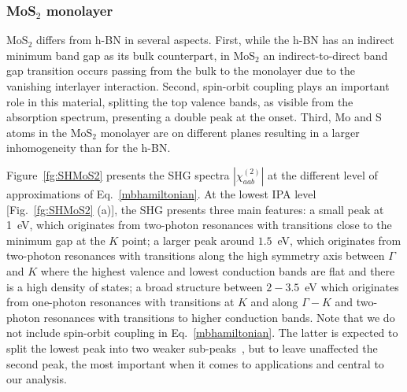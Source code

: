 \subsubsection{MoS$_2$ monolayer}
MoS$_2$ differs from h-BN in several aspects. First, while the h-BN has an indirect minimum band gap as its bulk counterpart, in MoS$_2$ an indirect-to-direct band gap transition occurs passing from the bulk to the monolayer due to the vanishing interlayer interaction.  Second, spin-orbit coupling plays an important role in this material, splitting the top valence bands, as visible from the absorption spectrum, presenting a double peak at the onset.\cite{PhysRevLett.105.136805} Third, Mo and S atoms in the MoS$_2$ monolayer are on different planes resulting in a larger inhomogeneity than for the h-BN.

Figure~\ref{fg:SHMoS2} presents the SHG spectra $|\chi^{(2)}_{aab}|$  at the different level of approximations of Eq.~\eqref{mbhamiltonian}. At the lowest IPA level [Fig.~\ref{fg:SHMoS2} (a)], the SHG presents three main features: a small peak at 1~eV, which originates from two-photon resonances with transitions close to the minimum gap at the $K$ point; a larger peak around $1.5$~eV, which originates from two-photon resonances with transitions along the high symmetry axis between $\Gamma$ and $K$ where the highest valence and lowest conduction bands are flat and there is a high density of states; a broad structure between $2-3.5$~eV which originates from one-photon resonances with transitions at $K$ and along $\Gamma-K$ and two-photon resonances with transitions to higher conduction bands. Note that we do not include spin-orbit coupling in Eq.~\eqref{mbhamiltonian}. The latter is expected to split the lowest peak into two weaker sub-peaks~\cite{molina2013effect}, but to leave unaffected the second peak, the most important when it comes to applications and central to our analysis.\cite{PhysRevB.87.201401}  

